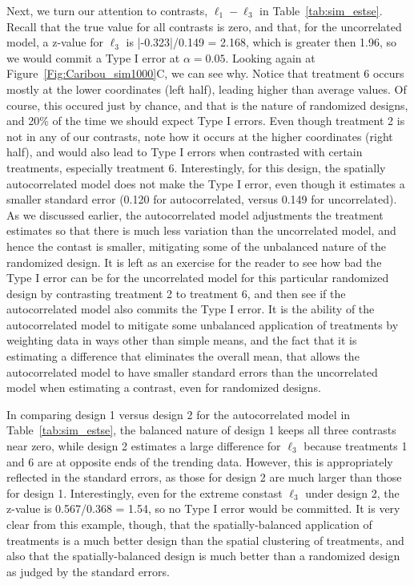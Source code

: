 \documentclass[12pt, titlepage]{article}
\begin{document}
Next, we turn our attention to contrasts, $\ell_{1} - \ell_{3}$ in Table~\ref{tab:sim_estse}.  Recall that the true value for all contrasts is zero, and that, for the uncorrelated model, a z-value for $\ell_{3}$ is |-0.323|/0.149 = 2.168, which is greater then 1.96, so we would commit a Type I error at $\alpha = 0.05$.  Looking again at Figure~\ref{Fig:Caribou_sim1000}C, we can see why.  Notice that treatment 6 occurs mostly at the lower coordinates (left half), leading higher than average values.  Of course, this occured just by chance, and that is the nature of randomized designs, and 20\% of the time we should expect Type I errors.  Even though treatment 2 is not in any of our contrasts, note how it occurs at the higher coordinates (right half), and would also lead to Type I errors when contrasted with certain treatments, especially treatment 6.  Interestingly, for this design, the spatially autocorrelated model does not make the Type I error, even though it estimates a smaller standard error (0.120 for autocorrelated, versus 0.149 for uncorrelated).  As we discussed earlier, the autocorrelated model adjustments the treatment estimates so that there is much less variation than the uncorrelated model, and hence the contast is smaller, mitigating some of the unbalanced nature of the randomized design.  It is left as an exercise for the reader to see how bad the Type I error can be for the uncorrelated model for this particular randomized design by contrasting treatment 2 to treatment 6, and then see if the autocorrelated model also commits the Type I error.  It is the ability of the autocorrelated model to mitigate some unbalanced application of treatments by weighting data in ways other than simple means, and the fact that it is estimating a difference that eliminates the overall mean, that allows the autocorrelated model to have smaller standard errors than the uncorrelated model when estimating a contrast, even for randomized designs.

In comparing design 1 versus design 2 for the autocorrelated model in Table~\ref{tab:sim_estse}, the balanced nature of design 1 keeps all three contrasts near zero, while design 2 estimates a large difference for $\ell_{3}$ because treatments 1 and 6 are at opposite ends of the trending data.  However, this is appropriately reflected in the standard errors, as those for design 2 are much larger than those for design 1.  Interestingly, even for the extreme constast $\ell_{3}$ under design 2, the z-value is 0.567/0.368 = 1.54, so no Type I error would be committed.  It is very clear from this example, though, that the spatially-balanced application of treatments is a much better design than the spatial clustering of treatments, and also that the spatially-balanced design is much better than a randomized design as judged by the standard errors.
\end{document}

